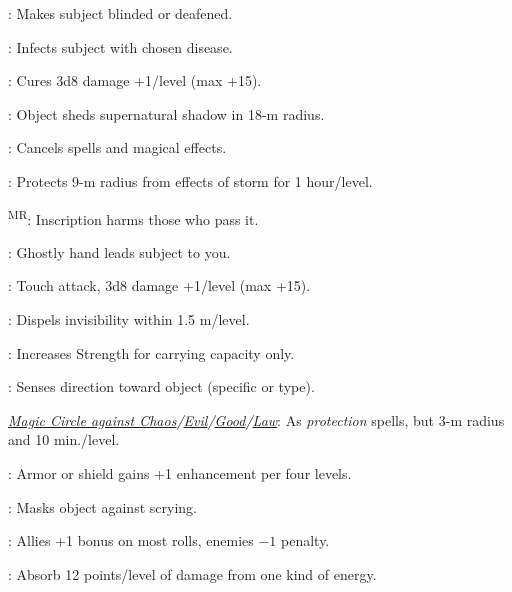 : Makes subject blinded or deafened.

: Infects subject with chosen disease.



: Cures 3d8 damage +1/level (max +15).


: Object sheds supernatural shadow in 18-m radius.

: Cancels spells and magical effects.

: Protects 9-m radius from effects of storm for 1 hour/level. %

\textsuperscript{MR}: Inscription harms those who pass it.

: Ghostly hand leads subject to you.

: Touch attack, 3d8 damage +1/level (max +15).

: Dispels invisibility within 1.5 m/level.

: Increases Strength for carrying capacity only. %

: Senses direction toward object (specific or type).

\noindent\textit{\hyperref[spell:Magic Circle against Chaos]{Magic Circle against Chaos}/\hyperref[spell:Magic Circle against Evil]{Evil}/\hyperref[spell:Magic Circle against Good]{Good}/\hyperref[spell:Magic Circle against Law]{Law}}: As \emph{protection} spells, but 3-m radius and 10 min./level.

: Armor or shield gains +1 enhancement per four levels.


: Masks object against scrying.

: Allies +1 bonus on most rolls, enemies $-1$ penalty.

: Absorb 12 points/level of damage from one kind of energy.

